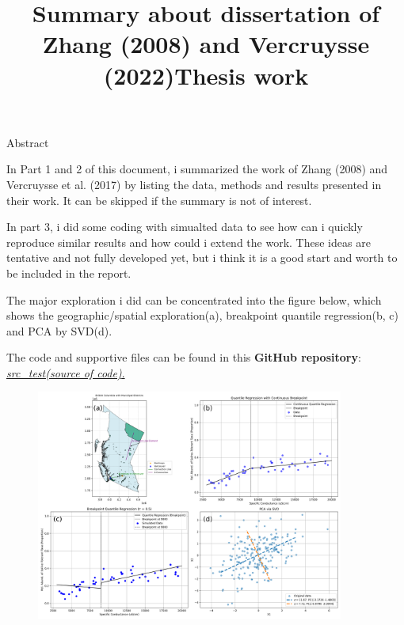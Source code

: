 \documentclass{article}
\title{Summary about dissertation of Zhang (2008) and Vercruysse (2022)Thesis work}
\begin{document}
\maketitle

\begin{center}
    {\Large Abstract}
\end{center}

    In Part 1 and 2 of this document, i summarized the work of Zhang (2008) and Vercruysse et al. (2017) by listing the data, methods and results presented in their work.
    It can be skipped if the summary is not of interest.

    In part 3, i did some coding with simualted data to see how can i quickly reproduce similar results and how could i extend the work.
    These ideas are tentative and not fully developed yet, but i think it is a good start and worth to be included in the report.

The major exploration i did can be concentrated into the figure below, which shows the geographic/spatial exploration(a), 
breakpoint quantile regression(b, c) and PCA by SVD(d).

The code and supportive files can be found in this \textbf{GitHub repository}: \href{https://github.com/Gufeng-2002/Reading_Notes/tree/main}{\textit{src\_test(source of code)}.}

\begin{figure}[!h]
    \centering
    \includegraphics[width=0.9\textwidth]{../src_test/results/combined_plot.png}
\end{figure}


\newpage
\begin{center}
    \tableofcontents
\end{center}
\end{document}
